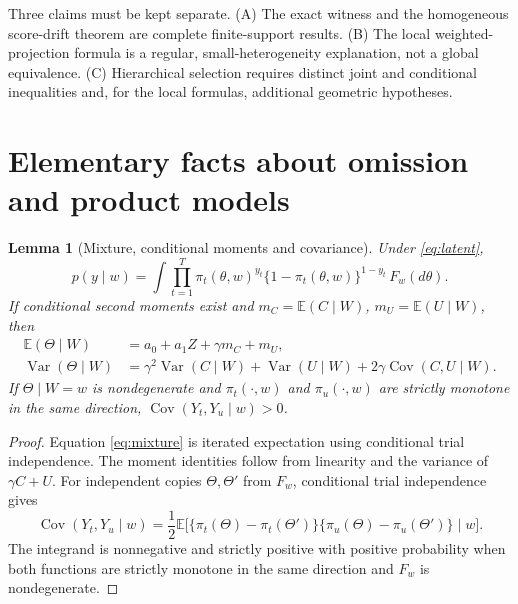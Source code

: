 \documentclass[11pt,letterpaper]{article}
\theoremstyle{plain}
\newtheorem{lemma}[theorem]{Lemma}
\theoremstyle{definition}
\newcommand{\Var}{\operatorname{Var}}
\newcommand{\Cov}{\operatorname{Cov}}
\newcommand{\E}{\mathbb E}
\begin{document}
Three claims must be kept separate. (A) The exact witness and the homogeneous score-drift theorem are complete finite-support results. (B) The local weighted-projection formula is a regular, small-heterogeneity explanation, not a global equivalence. (C) Hierarchical selection requires distinct joint and conditional inequalities and, for the local formulas, additional geometric hypotheses.

\section{Elementary facts about omission and product models}
\begin{lemma}[Mixture, conditional moments and covariance]\label{lem:mixture}
Under \eqref{eq:latent},
\begin{equation}\label{eq:mixture}
p(y\mid w)=\int\prod_{t=1}^T\pi_t(\theta,w)^{y_t}\{1-\pi_t(\theta,w)\}^{1-y_t}\,F_w(d\theta).
\end{equation}
If conditional second moments exist and $m_C=\E(C\mid W)$, $m_U=\E(U\mid W)$, then
\begin{align*}
\E(\Theta\mid W)&=a_0+a_1 Z+\gamma m_C+m_U,\\
\Var(\Theta\mid W)&=\gamma^2\Var(C\mid W)+\Var(U\mid W)+2\gamma\Cov(C,U\mid W).
\end{align*}
If $\Theta\mid W=w$ is nondegenerate and $\pi_t(\cdot,w)$ and $\pi_u(\cdot,w)$ are strictly monotone in the same direction, $\Cov(Y_t,Y_u\mid w)>0$.
\end{lemma}
\begin{proof}
Equation \eqref{eq:mixture} is iterated expectation using conditional trial independence. The moment identities follow from linearity and the variance of $\gamma C+U$. For independent copies $\Theta,\Theta'$ from $F_w$, conditional trial independence gives
\[
\Cov(Y_t,Y_u\mid w)=\frac12\E\big[\{\pi_t(\Theta)-\pi_t(\Theta')\}\{\pi_u(\Theta)-\pi_u(\Theta')\}\mid w\big].
\]
The integrand is nonnegative and strictly positive with positive probability when both functions are strictly monotone in the same direction and $F_w$ is nondegenerate.
\end{proof}
\end{document}
